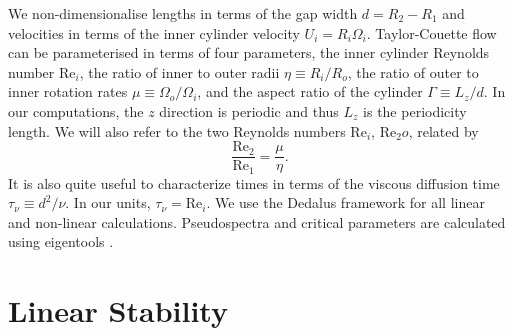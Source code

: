 \documentclass[openacc]{rstransa}%
\newcommand{\Reyn}{\mathrm{Re}}
\begin{document}
We non-dimensionalise lengths in terms of the gap width $d = R_2 - R_1$ and velocities in terms of the inner cylinder velocity $U_i = R_i \Omega_i$. Taylor-Couette flow can be parameterised in terms of four parameters, the inner cylinder Reynolds number $\Reyn_i$, the ratio of inner to outer radii $\eta \equiv R_i/R_o$, the ratio of outer to inner rotation rates $\mu \equiv \Omega_o/\Omega_i$, and the aspect ratio of the cylinder $\Gamma \equiv L_z/d$. In our computations, the $z$ direction is periodic and thus $L_z$ is the periodicity length. We will also refer to the two Reynolds numbers $\Reyn_i$, $\Reyn_2o$, related by
\begin{equation}
    \frac{\Reyn_2}{\Reyn_1} = \frac{\mu}{\eta}.
\end{equation}
It is also quite useful to characterize times in terms of the viscous diffusion time $\tau_\nu \equiv d^2/\nu$. In our units, $\tau_\nu = \Reyn_i$.
We use the Dedalus framework \cite{2020PhRvR...2b3068B} for all linear and non-linear calculations. Pseudospectra and critical parameters are calculated using eigentools \cite{2021JOSS....6.3079O}.
\section{Linear Stability}
\label{sec:linear}
\end{document}
